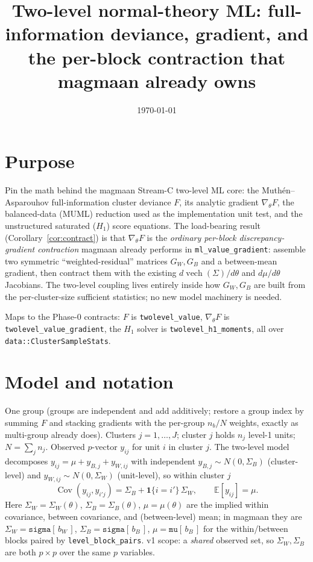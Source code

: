\documentclass[11pt]{article}
\title{Two-level normal-theory ML: full-information deviance, gradient,
and the per-block contraction that magmaan already owns}
\author{}
\date{\today}
\newcommand{\E}{\mathbb{E}}
\newcommand{\Cov}{\operatorname{Cov}}
\newcommand{\vech}{\operatorname{vech}}
\newcommand{\Sw}{\Sigma_W}
\newcommand{\Sb}{\Sigma_B}
\theoremstyle{plain}
\theoremstyle{remark}
\begin{document}
\maketitle

\section*{Purpose}

Pin the math behind the magmaan Stream-C two-level ML core: the
Mu\-th\'en--Asparouhov full-information cluster deviance $F$, its analytic
gradient $\nabla_\theta F$, the balanced-data (MUML) reduction used as the
implementation unit test, and the unstructured saturated ($H_1$) score
equations. The load-bearing result (Corollary~\ref{cor:contract}) is that
$\nabla_\theta F$ is the \emph{ordinary per-block discrepancy-gradient
contraction} magmaan already performs in \texttt{ml\_value\_gradient}: assemble
two symmetric ``weighted-residual'' matrices $G_W,G_B$ and a between-mean
gradient, then contract them with the existing $d\vech(\Sigma)/d\theta$ and
$d\mu/d\theta$ Jacobians. The two-level coupling lives entirely inside how
$G_W,G_B$ are built from the per-cluster-size sufficient statistics; no new
model machinery is needed.

Maps to the Phase-0 contracts: $F$ is \texttt{twolevel\_value}, $\nabla_\theta
F$ is \texttt{twolevel\_value\_gradient}, the $H_1$ solver is
\texttt{twolevel\_h1\_moments}, all over \texttt{data::ClusterSampleStats}.

\section{Model and notation}

One group (groups are independent and add additively; restore a group index by
summing $F$ and stacking gradients with the per-group $n_b/N$ weights, exactly
as multi-group already does). Clusters $j=1,\dots,J$; cluster $j$ holds $n_j$
level-1 units; $N=\sum_j n_j$. Observed $p$-vector $y_{ij}$ for unit $i$ in
cluster $j$. The two-level model decomposes $y_{ij}=\mu+y_{B,j}+y_{W,ij}$ with
independent $y_{B,j}\sim N(0,\Sb)$ (cluster-level) and $y_{W,ij}\sim N(0,\Sw)$
(unit-level), so within cluster $j$
\[
\Cov(y_{ij},y_{i'j})=\Sb+\mathbf 1\{i=i'\}\,\Sw,\qquad
\E[y_{ij}]=\mu .
\]
Here $\Sw=\Sw(\theta)$, $\Sb=\Sb(\theta)$, $\mu=\mu(\theta)$ are the implied
within covariance, between covariance, and (between-level) mean; in magmaan they
are $\Sw=\texttt{sigma}[\,b_W\,]$, $\Sb=\texttt{sigma}[\,b_B\,]$,
$\mu=\texttt{mu}[\,b_B\,]$ for the within/between blocks paired by
\texttt{level\_block\_pairs}. v1 scope: a \emph{shared} observed set, so
$\Sw,\Sb$ are both $p\times p$ over the same $p$ variables.
\end{document}
